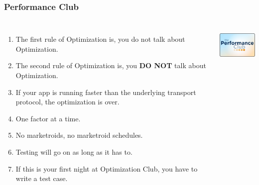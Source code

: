 \documentclass{beamer}
\begin{document}
\begin{frame}[fragile]
  \frametitle{Performance Club}

  \vfill

\begin{columns}[c]

  \begin{enumerate}
  \item<1-> The first rule of Optimization is, you do not talk about Optimization.
  \item<1-> The second rule of Optimization is, you \textbf{DO NOT} talk about
    Optimization.
  \item<2-> If your app is running faster than the underlying transport
    protocol, the optimization is over.
  \item<2-> One factor at a time.
  \item<2-> No marketroids, no marketroid schedules.
  \item<3-> Testing will go on as long as it has to.
  \item<4-> If this is your first night at Optimization Club, you have to
    write a test case.
  \end{enumerate}


\begin{center}
  \includegraphics[height=5em]{performanceClubPromo.jpg}
\end{center}
\end{columns}
\end{frame}
\end{document}
